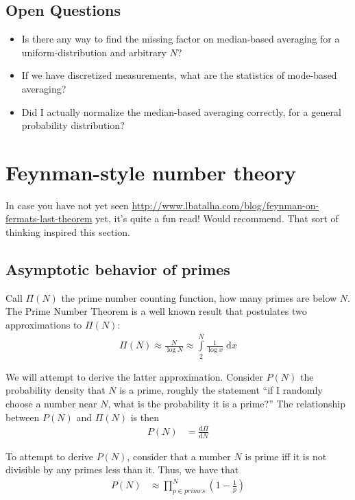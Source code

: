 \documentclass[10pt]{article}
\newcommand{\rd}[2]{\frac{\mathrm{d}#1}{\mathrm{d}#2}}
\begin{document}
\subsection{Open Questions}

\begin{itemize}
    \item Is there any way to find the missing factor on median-based averaging
        for a uniform-distribution and arbitrary $N$?
    \item If we have discretized measurements, what are the statistics of
        mode-based averaging?
    \item Did I actually normalize the median-based averaging correctly, for a
        general probability distribution?
\end{itemize}

\clearpage

\section{Feynman-style number theory}

In case you have not yet seen
\url{http://www.lbatalha.com/blog/feynman-on-fermats-last-theorem} yet, it's
quite a fun read! Would recommend. That sort of thinking inspired this section.

\subsection{Asymptotic behavior of primes}

Call $\Pi(N)$ the prime number counting function, how many primes are below $N$.
The Prime Number Theorem is a well known result that postulates two
approximations to $\Pi(N)$:
\begin{align}
    \Pi(N) \approx \frac{N}{\log N} \approx \int\limits_{2}^{N}\frac{1}{\log
    x}\;\mathrm{d}x
\end{align}

We will attempt to derive the latter approximation. Consider $P(N)$ the
probability density that $N$ is a prime, roughly the statement ``if I randomly
choose a number near $N$, what is the probability it is a prime?'' The
relationship between $P(N)$ and $\Pi(N)$ is then
\begin{align}
    P(N) &= \rd{\Pi}{N}
\end{align}

To attempt to derive $P(N)$, consider that a number $N$ is prime iff it is not
divisible by any primes less than it. Thus, we have that
\begin{align}
    P(N) &\approx \prod_{p \in primes}^{N}\left( 1 - \frac{1}{p} \right)
\end{align}
\end{document}
